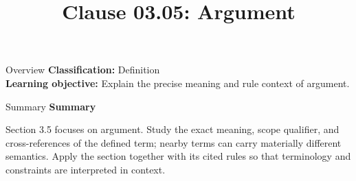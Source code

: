 \documentclass[10pt,letterpaper]{article}
\title{Clause 03.05: Argument}
\author{}
\date{}
\begin{document}
\maketitle
\begin{CornellOverviewBox}{Overview}
\textbf{Classification:} Definition\\[2pt]
\textbf{Learning objective:} Explain the precise meaning and rule context of argument.
\end{CornellOverviewBox}\begin{CornellSummaryBox}{Summary}
{\sffamily\bfseries\color{Accent} Summary}\par\vspace{3pt}Section 3.5 focuses on argument. Study the exact meaning, scope qualifier, and cross-references of the defined term; nearby terms can carry materially different semantics. Apply the section together with its cited rules so that terminology and constraints are interpreted in context.
\end{CornellSummaryBox}
\end{document}
